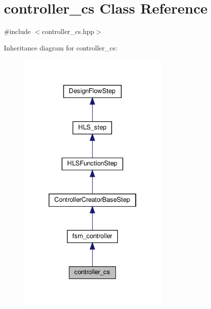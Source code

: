 \hypertarget{classcontroller__cs}{}\section{controller\+\_\+cs Class Reference}
\label{classcontroller__cs}


{\ttfamily \#include $<$controller\+\_\+cs.\+hpp$>$}



Inheritance diagram for controller\+\_\+cs\+:
\nopagebreak
\begin{figure}[H]
\begin{center}
\leavevmode
\includegraphics[width=214pt]{d7/dd2/classcontroller__cs__inherit__graph}
\end{center}
\end{figure}


